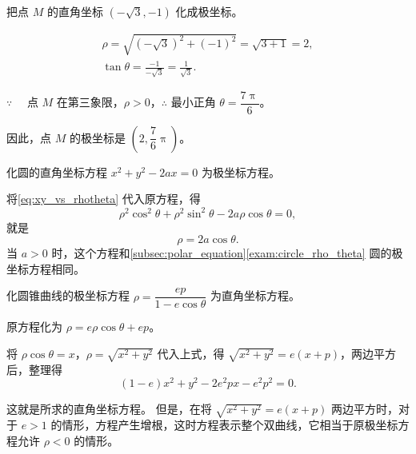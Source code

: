 \begin{example}
  把点 $M$ 的直角坐标 $(-\sqrt{3},-1)$ 化成极坐标。
\end{example}
\begin{solution}
  \begin{gather*}
    \rho = \sqrt{(-\sqrt{3})^2+(-1)^2}=\sqrt{3+1}=2,\\
    \tan\theta=\frac{-1}{-\sqrt{3}}=\frac{1}{\sqrt{3}}.
  \end{gather*}
  
  $\because\quad$ 点 $M$ 在第三象限，$\rho>0$，$\therefore$ 最小正角 $\theta= \dfrac{7\uppi}{6}$。

  因此，点 $M$ 的极坐标是 $(2,\dfrac{7}{6}\uppi)$。
\end{solution}

\begin{example}
  化圆的直角坐标方程 $x^2+y^2-2ax=0$ 为极坐标方程。
\end{example}
\begin{solution}
  将\cref{eq:xy_vs_rhotheta} 代入原方程，得
  \[\rho^2\cos^2\theta+\rho^2\sin^2\theta-2a\rho\cos\theta=0,\]
  就是
  \[\rho=2a\cos\theta.\]
  当 $a>0$ 时，这个方程和\cref{subsec:polar_equation}\cref{exam:circle_rho_theta} 圆的极坐标方程相同。
\end{solution}

\begin{example}
  化圆锥曲线的极坐标方程 $\rho=\dfrac{ep}{1-e\cos\theta}$ 为直角坐标方程。
\end{example}
\begin{solution}
  原方程化为 $\rho=e\rho\cos\theta+ep$。

  将 $\rho\cos\theta=x$，$\rho=\sqrt{x^2+y^2}$ 代入上式，得 $\sqrt{x^2+y^2}= e(x+p)$，两边平方后，整理得
  \[ (1-e)x^2+y^2- 2e^2px-e^2p^2=0.\]

  这就是所求的直角坐标方程。
  但是，在将 $\sqrt{x^2+y^2}=e(x+p)$ 两边平方时，对于 $e>1$ 的情形，方程产生增根，这时方程表示整个双曲线，它相当于原极坐标方程允许 $\rho<0$ 的情形。
\end{solution}

